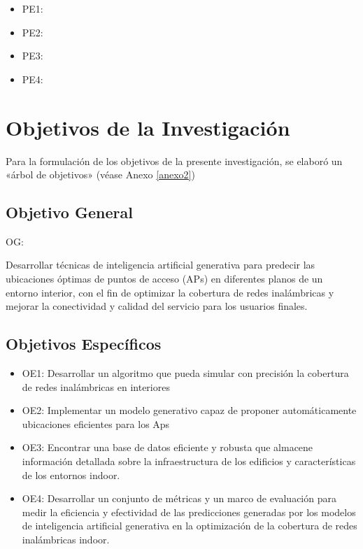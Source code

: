 \begin{itemize}
	\item PE1: {\Pbone}
	\item PE2: {\Pbtwo}
	\item PE3: {\Pbthree}
	\item PE4: {\Pbfour}
\end{itemize}

\section{Objetivos de la Investigación}
Para la formulación de los objetivos de la presente investigación, se elaboró un «árbol de objetivos» (véase Anexo \ref{anexo2}) 
\subsection{Objetivo General}
OG: \newcommand{\ObjetivoGeneral}{
Desarrollar técnicas de inteligencia artificial generativa para predecir las ubicaciones óptimas de puntos de acceso (APs) en diferentes planos de un entorno interior, con el fin de optimizar la cobertura de redes inalámbricas y mejorar la conectividad y calidad del servicio para los usuarios finales.
}
\ObjetivoGeneral
\subsection{Objetivos Específicos}
\newcommand{\Objone}{
Desarrollar un algoritmo que pueda simular con precisión la cobertura de redes inalámbricas en interiores
}
\newcommand{\Objtwo}{
Implementar un modelo generativo capaz de proponer automáticamente ubicaciones eficientes para los Aps
}
\newcommand{\Objthree}{
Encontrar una base de datos eficiente y robusta que almacene información detallada sobre la infraestructura de los edificios y características de los entornos indoor.
}
\newcommand{\Objfour}{
Desarrollar un conjunto de métricas y un marco de evaluación para medir la eficiencia y efectividad de las predicciones generadas por los modelos de inteligencia artificial generativa en la optimización de la cobertura de redes inalámbricas indoor.
}

\begin{itemize}
	\item OE1: {\Objone}
	\item OE2: {\Objtwo}
	\item OE3: {\Objthree}
	\item OE4: {\Objfour}
\end{itemize}

